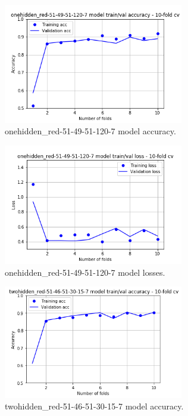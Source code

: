 \begin{figure}
	\centering
	\includegraphics[width=0.7\textwidth]{./TeX_files/img/m1_auto_acc.png}
	\caption{onehidden\_red-51-49-51-120-7 model accuracy.}
	\label{fig:m1automodelacc}
\end{figure}

\begin{figure}
	\centering
	\includegraphics[width=0.7\textwidth]{./TeX_files/img/m1_auto_loss.png}
	\caption{onehidden\_red-51-49-51-120-7 model losses.}
	\label{fig:m1automodelloss}
\end{figure}

\begin{figure}
	\centering
	\includegraphics[width=0.7\textwidth]{./TeX_files/img/m2_auto_acc.png}
	\caption{twohidden\_red-51-46-51-30-15-7 model accuracy.}
	\label{fig:m2automodelacc}
\end{figure}

